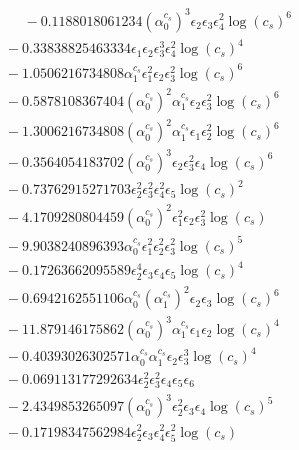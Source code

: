 \documentclass[10pt]{article}
\begin{document}
\begin{align*}
\phantom{F_{s,7}} &\phantom{={}}{}  - 0.1188018061234 \left(\alpha_{0}^{c_s}\right)^{3} \epsilon_{2} \epsilon_{3} \epsilon_{4}^{2} \log{\left(c_{s} \right)}^{6} \\
&{}  - 0.33838825463334 \epsilon_{1} \epsilon_{2} \epsilon_{3}^{3} \epsilon_{4}^{2} \log{\left(c_{s} \right)}^{4} \\
&{}  - 1.0506216734808 \alpha_{1}^{c_s} \epsilon_{1}^{2} \epsilon_{2} \epsilon_{3}^{2} \log{\left(c_{s} \right)}^{6} \\
&{}  - 0.5878108367404 \left(\alpha_{0}^{c_s}\right)^{2} \alpha_{1}^{c_s} \epsilon_{2} \epsilon_{3}^{2} \log{\left(c_{s} \right)}^{6} \\
&{}  - 1.3006216734808 \left(\alpha_{0}^{c_s}\right)^{2} \alpha_{1}^{c_s} \epsilon_{1} \epsilon_{2}^{2} \log{\left(c_{s} \right)}^{6} \\
&{}  - 0.3564054183702 \left(\alpha_{0}^{c_s}\right)^{3} \epsilon_{2} \epsilon_{3}^{2} \epsilon_{4} \log{\left(c_{s} \right)}^{6} \\
&{}  - 0.73762915271703 \epsilon_{2}^{2} \epsilon_{3}^{2} \epsilon_{4}^{2} \epsilon_{5} \log{\left(c_{s} \right)}^{2} \\
&{}  - 4.1709280804459 \left(\alpha_{0}^{c_s}\right)^{2} \epsilon_{1}^{2} \epsilon_{2} \epsilon_{3}^{2} \log{\left(c_{s} \right)} \\
&{}  - 9.9038240896393 \alpha_{0}^{c_s} \epsilon_{1}^{2} \epsilon_{2}^{2} \epsilon_{3}^{2} \log{\left(c_{s} \right)}^{5} \\
&{}  - 0.17263662095589 \epsilon_{2}^{4} \epsilon_{3} \epsilon_{4} \epsilon_{5} \log{\left(c_{s} \right)}^{4} \\
&{}  - 0.6942162551106 \alpha_{0}^{c_s} \left(\alpha_{1}^{c_s}\right)^{2} \epsilon_{2} \epsilon_{3} \log{\left(c_{s} \right)}^{6} \\
&{}  - 11.879146175862 \left(\alpha_{0}^{c_s}\right)^{3} \alpha_{1}^{c_s} \epsilon_{1} \epsilon_{2} \log{\left(c_{s} \right)}^{4} \\
&{}  - 0.40393026302571 \alpha_{0}^{c_s} \alpha_{1}^{c_s} \epsilon_{2} \epsilon_{3}^{3} \log{\left(c_{s} \right)}^{4} \\
&{}  - 0.069113177292634 \epsilon_{2}^{2} \epsilon_{3}^{2} \epsilon_{4} \epsilon_{5} \epsilon_{6} \\
&{}  - 2.4349853265097 \left(\alpha_{0}^{c_s}\right)^{3} \epsilon_{2}^{2} \epsilon_{3} \epsilon_{4} \log{\left(c_{s} \right)}^{5} \\
&{}  - 0.17198347562984 \epsilon_{2}^{2} \epsilon_{3} \epsilon_{4}^{2} \epsilon_{5}^{2} \log{\left(c_{s} \right)} \\

\end{align*}
\end{document}
